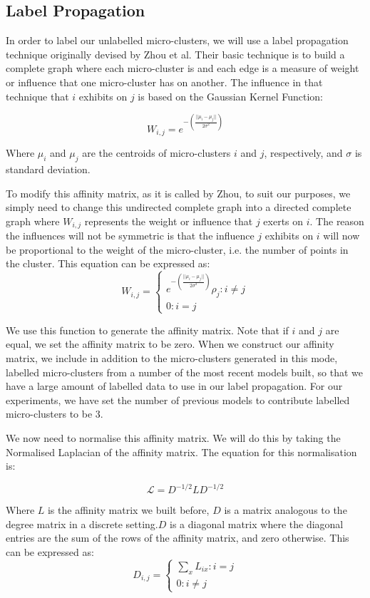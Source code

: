 \documentclass[12pt,a4paper,oneside]{report}
\begin{document}
\subsection*{Label Propagation}

In order to label our unlabelled micro-clusters, we will use a label propagation technique originally devised by Zhou et al\cite{LabProp}. Their basic technique is to build a complete graph where each micro-cluster is and each edge is a measure of weight or influence that one micro-cluster has on another. The influence in that technique that \(i\) exhibits on \(j\) is based on the Gaussian Kernel Function:

\[W_{i,j} = e^{-(\frac{||\mu_i-\mu_j||}{2\sigma^2})}\]

Where \(\mu_i\) and \(\mu_j\) are the centroids of micro-clusters \(i\) and \(j\), respectively, and $\sigma$ is standard deviation. 

To modify this affinity matrix, as it is called by Zhou, to suit our purposes, we simply need to change this undirected complete graph into a directed complete graph where \(W_{i,j}\) represents the weight or influence that \(j\) exerts on \(i\). The reason the influences will not be symmetric is that the influence \(j\) exhibits on \(i\) will now be proportional to the weight of the micro-cluster, i.e. the number of points in the cluster. This equation can be expressed as:
\[
	W_{i,j} =
	\begin{cases}
	 e^{-(\frac{||\mu_i-\mu_j||}{2\sigma^2})}\rho_j : i \neq j \\
	0 :					 i  = j 
\end{cases}\] 

We use this function to generate the affinity matrix. Note that if $i$ and $j$ are equal, we set the affinity matrix to be zero. When we construct our affinity matrix, we include in addition to the micro-clusters generated in this mode, labelled micro-clusters from a number of the most recent models built, so that we have a large amount of labelled data to use in our label propagation. For our experiments, we have set the number of previous models to contribute labelled micro-clusters to be 3.

We now need to normalise this affinity matrix. We will do this by taking the Normalised Laplacian of the affinity matrix. The equation for this normalisation is:

\[ \mathscr{L} = D^{-1/2}LD^{-1/2}\] 

Where $L$ is the affinity matrix we built before,  $D$ is a matrix analogous to the degree matrix in a discrete setting.$D$ is a diagonal matrix where the diagonal entries are the sum of the rows of the affinity matrix, and zero otherwise. This can be expressed as:
\[
	D_{i,j} =
	\begin{cases} 
	 \sum_{x} L_{ix} : i = j \\
	0 :					 i  \neq j 
\end{cases}\] 
\end{document}
